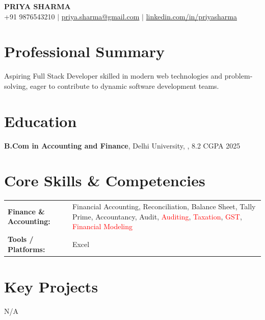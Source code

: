 \documentclass[10pt,a4paper]{article}
\begin{document}
\begin{center}
{\LARGE \textsc{\textbf{PRIYA SHARMA}}} \\ \vspace{3pt}
+91 9876543210 \quad $|$ \quad \href{mailto:priya.sharma@gmail.com}{priya.sharma@gmail.com} \quad $|$ \quad \href{https://linkedin.com/in/priyasharma}{linkedin.com/in/priyasharma}
\end{center}

\section*{Professional Summary}
Aspiring Full Stack Developer skilled in modern web technologies and problem-solving, eager to contribute to dynamic software development teams.

\section*{Education}
\noindent \textbf{B.Com in Accounting and Finance}, Delhi University, , 8.2 CGPA \hfill 2025 \\ \vspace{4pt}


\section*{Core Skills \& Competencies}
\begin{tabular}{@{}p{2.3in}p{4.5in}@{}}
\textbf{Finance \& Accounting:} & Financial Accounting, Reconciliation, Balance Sheet, Tally Prime, Accountancy, Audit, \textcolor{red}{Auditing}, \textcolor{red}{Taxation}, \textcolor{red}{GST}, \textcolor{red}{Financial Modeling} \\
\textbf{Tools / Platforms:} & Excel \\
\end{tabular}



\section*{Key Projects}
N/A


\end{document}
